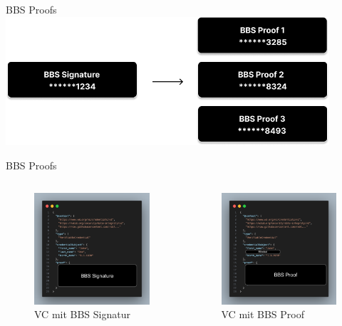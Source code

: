 \documentclass[
	german,%
	authorontitle=true,
	]{bfhbeamer}
\begin{document}
\begin{frame}{BBS Proofs}
    \centering
    \includegraphics[width=120mm]{../img/BBSProofGen.png}
\end{frame}

\begin{frame}{BBS Proofs}
    \begin{columns}[onlytextwidth,T]
        \column{70mm}  
        \begin{figure}
            \centering
            \includegraphics[width=60mm]{../img/VCSignBlock.png}
            \caption{VC mit BBS Signatur}
        \end{figure}

        \column{70mm}

        \begin{figure}
            \centering
            \includegraphics[width=60mm]{../img/VCProofBlock.png}
            \caption{VC mit BBS Proof}
        \end{figure}

    \end{columns}
\end{frame}
\end{document}
